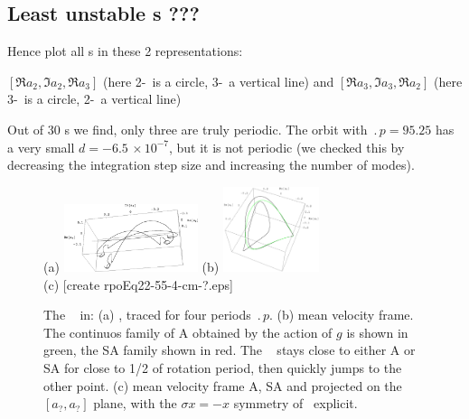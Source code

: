 %


\subsection{Least unstable \rpo s ???}

Hence plot all \rpo s in these 2 representations:

$[ \Re a_2, \Im a_2, \Re a_3 ]$
(here 2-\eqv\  is a circle, 3-\eqv\ a vertical line)
 and
$[ \Re a_3, \Im a_3, \Re a_2 ]$
(here 3-\eqv\ is a circle, 2-\eqv\ a vertical line)

%
Out of 30 \rpo s we
find,  only three are truly periodic.  The orbit
with $\period{p} = 95.25$ has a very small
$d = -6.5\,\times 10^{-7}$, but it is not periodic
(we
checked this by decreasing the integration step size and increasing the
number of modes).


\begin{figure}[t] \label{f:rpo55}
\begin{center}
(a) \includegraphics[width=0.35\textwidth]{figs/rpo22-55-4-clean.eps}
(b) \includegraphics[width=0.25\textwidth]{figs/rpoEq22-55-4-cm.eps}
\\
(c) [create rpoEq22-55-4-cm-?.eps]
\end{center}
\caption{
 The \rpo\  in:
 (a) \Statesp, traced for four periods $\period{p}$.
 (b) mean velocity frame.
        The continuos family of
    {\eqva} A obtained by the action of $g$ is shown in green,
    the SA family shown in red. The \rpo\  stays close
    to either A or SA for close to 1/2 of {\eqv} rotation
    period, then quickly jumps to the other {\eqv} point.
 (c) mean velocity frame A, SA and  projected on the
    $[a_?,a_?]$ plane,
    with the $\sigma x = -x$ symmetry of \KSe\ explicit.
        }
\end{figure}



